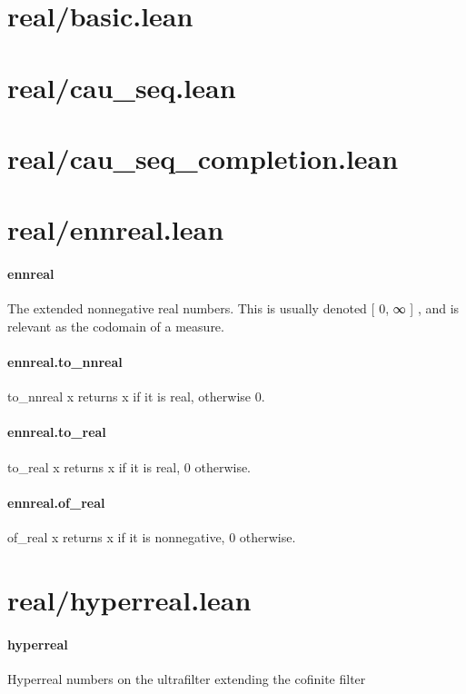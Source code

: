 \documentclass{article}
\begin{document}
\section{real/basic.lean}\section{real/cau\_seq.lean}\section{real/cau\_seq\_completion.lean}\section{real/ennreal.lean}\paragraph{ennreal}
\par
The extended nonnegative real numbers. This is usually denoted 
{[}
0, ∞
{]}
,
and is relevant as the codomain of a measure.
\paragraph{ennreal.to\_nnreal}
\par
\colorbox[RGB]{253,246,227}{{{{\color[RGB]{101, 123, 131} to\_nnreal x }}}} returns 
\colorbox[RGB]{253,246,227}{{{{\color[RGB]{101, 123, 131} x }}}} if it is real, otherwise 0.
\paragraph{ennreal.to\_real}
\par
\colorbox[RGB]{253,246,227}{{{{\color[RGB]{101, 123, 131} to\_real x }}}} returns 
\colorbox[RGB]{253,246,227}{{{{\color[RGB]{101, 123, 131} x }}}} if it is real, 
\colorbox[RGB]{253,246,227}{{{{\color[RGB]{108, 113, 196} 0 }}}} otherwise.
\paragraph{ennreal.of\_real}
\par
\colorbox[RGB]{253,246,227}{{{{\color[RGB]{101, 123, 131} of\_real x }}}} returns 
\colorbox[RGB]{253,246,227}{{{{\color[RGB]{101, 123, 131} x }}}} if it is nonnegative, 
\colorbox[RGB]{253,246,227}{{{{\color[RGB]{108, 113, 196} 0 }}}} otherwise.
\section{real/hyperreal.lean}\paragraph{hyperreal}
\par
Hyperreal numbers on the ultrafilter extending the cofinite filter
\end{document}

